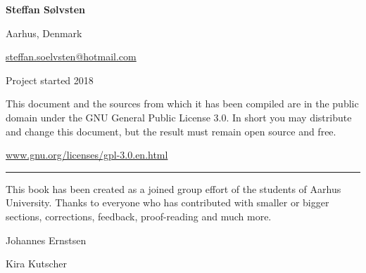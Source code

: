 \textbf{Steffan Sølvsten}

Aarhus, Denmark

\href{mailto:steffan.soelvsten@hotmail.com}{steffan.soelvsten@hotmail.com}

\vspace{1em}
\noindent Project started 2018

\vspace{1em}
\noindent This document and the sources from which it has been compiled are in
the public domain under the GNU General Public License 3.0. In short you may
distribute and change this document, but the result must remain open source and
free.

\begin{center}
  \href{https://www.gnu.org/licenses/gpl-3.0.en.html}{www.gnu.org/licenses/gpl-3.0.en.html}
\end{center}

\vspace{2em}
\noindent\hfil\rule{0.8\textwidth}{.4pt}\hfil

\vspace{2em}
\noindent This book has been created as a joined group effort of the students of Aarhus
University. Thanks to everyone who has contributed with smaller or bigger
sections, corrections, feedback, proof-reading and much more.

\begin{multicols}{2}
  Johannes Ernstsen

  \hfill
  \columnbreak
  
  Kira Kutscher
\end{multicols}
